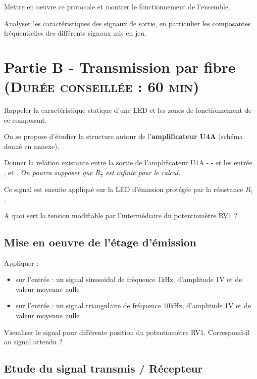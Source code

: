 \documentclass[a4paper,11pt]{article}
\begin{document}
\Real Mettre en oeuvre ce protocole et montrer le fonctionnement de l'ensemble.

\Real Analyser les caractéristiques des signaux de sortie, en particulier les composantes fréquentielles des différents signaux mis en jeu.


\newpage
\section{Partie B - Transmission par fibre \textsc{\normalsize(Durée conseillée : 60 min)}}

\Real Rappeler la caractéristique statique d'une LED et les zones de fonctionnement de ce composant. 

On se propose d'étudier la structure autour de l'\textbf{amplificateur U4A} (schéma donné en annexe).

\Real Donner la relation existante entre la sortie de l'amplificateur U4A -  - et les entrée ,  et . \textit{On pourra supposer que $R_7$ est infinie pour le calcul.}

Ce signal est ensuite appliqué sur la LED d'émission protégée par la résistance $R_1$.

\Real A quoi sert la tension  modifiable par l'intermédiaire du potentiomètre RV1 ?

\subsection*{Mise en oeuvre de l'étage d'émission}

\Real Appliquer :
\begin{itemize}
	\item sur l'entrée  : un signal sinusoïdal de fréquence 1kHz, d'amplitude 1V et de valeur moyenne nulle
	\item sur l'entrée  : un signal triangulaire de fréquence 10kHz, d'amplitude 1V et de valeur moyenne nulle
\end{itemize}

\Real Visualiser le signal  pour différente position du potentiomètre RV1. Correspond-il au signal attendu ?


\subsection*{Etude du signal transmis / Récepteur}
\end{document}
